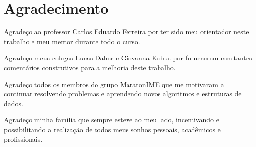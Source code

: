 \chapter*{Agradecimento}
\label{agradecimento}

Agradeço ao professor Carlos Eduardo Ferreira por ter sido meu orientador neste trabalho e meu mentor durante todo o curso. 

Agradeço meus colegas Lucas Daher e Giovanna Kobus por fornecerem constantes comentários construtivos para a melhoria deste trabalho.

Agradeço todos os membros do grupo MaratonIME que me motivaram a continuar resolvendo problemas e aprendendo novos algoritmos e estruturas de dados.

Agradeço minha família que sempre esteve ao meu lado, incentivando e possibilitando a realização de todos meus sonhos pessoais, acadêmicos e profissionais.